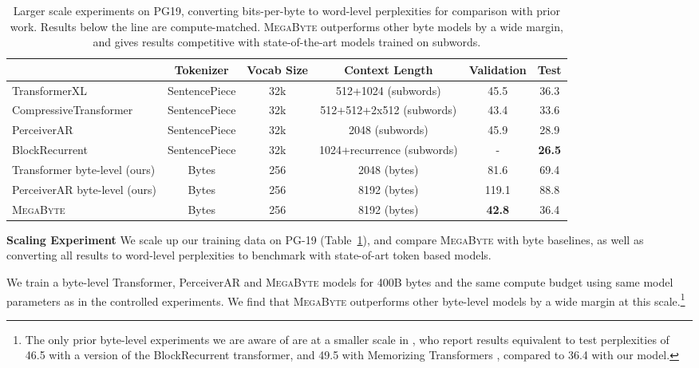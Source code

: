 \documentclass{article}
\newcommand{\fastslow}[0]{\textsc{MegaByte}\xspace}
\newcommand{\megabyte}[0]{\fastslow}
\theoremstyle{plain}
\theoremstyle{definition}
\theoremstyle{remark}
\begin{document}
\begin{table}[t]
\centering
\small
\begin{tabular}{lccccc}
\toprule
{} & Tokenizer & Vocab Size & Context Length & Validation & Test \\
\midrule
TransformerXL          \cite{compressive}       & SentencePiece & 32k & 512+1024 (subwords) & 45.5 & 36.3 \\
CompressiveTransformer \cite{compressive}       & SentencePiece & 32k & 512+512+2x512 (subwords) & 43.4 & 33.6 \\
PerceiverAR \cite{perceiverar}   & SentencePiece & 32k & 2048 (subwords) & 45.9 & 28.9 \\
BlockRecurrent \cite{blockrecurrent}            & SentencePiece & 32k & 1024+recurrence (subwords) & -   & \bf{26.5} \\
\midrule 
Transformer byte-level (ours)                   & Bytes         & 256 & 2048 (bytes) & 81.6 & 69.4  \\
PerceiverAR byte-level (ours)                   & Bytes         & 256 & 8192 (bytes) & 119.1 & 88.8 \\
\megabyte                                       & Bytes         & 256 & 8192 (bytes)  & \bf{42.8} & 36.4 \\
\bottomrule
\end{tabular}
\caption{\label{tab:text_sota}Larger scale experiments on PG19, converting bits-per-byte to word-level perplexities for comparison with prior work. Results below the line are compute-matched.  \megabyte outperforms other byte models by a wide margin, and gives results competitive with state-of-the-art models trained on subwords.}
\label{tab:pg19_summary}
\end{table}
\label{sec:results}

\textbf{Scaling Experiment} We scale up our training data on PG-19 (Table~\ref{tab:pg19_summary}), and compare \megabyte with byte baselines, as well as converting all results to word-level perplexities to benchmark with state-of-art token based models. 

We train a byte-level Transformer, PerceiverAR and \megabyte models for 400B bytes and the same compute budget using same model parameters as in the controlled experiments. We find that \megabyte outperforms other byte-level models by a wide margin at this scale.\footnote{The only prior byte-level experiments we are aware of are at a smaller scale in \citet{blockrecurrent}, who report results equivalent to test perplexities of 46.5 with a version of the BlockRecurrent transformer, and 49.5 with Memorizing Transformers \cite{memorizing}, compared to 36.4 with our model. } 
\end{document}
